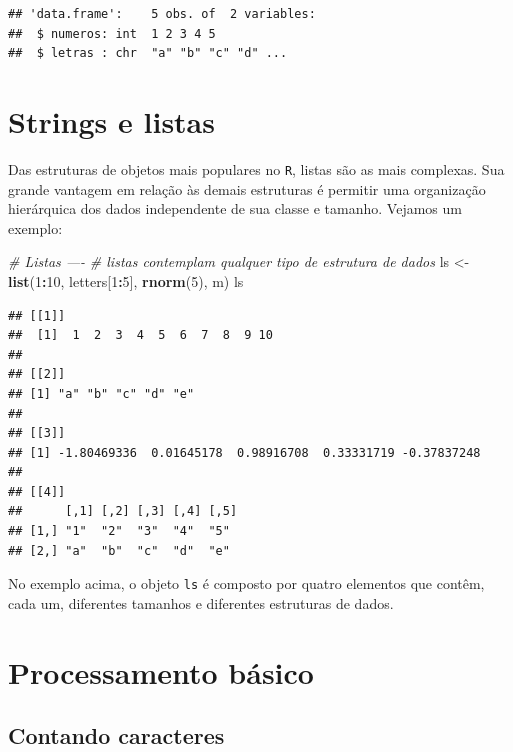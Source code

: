 \documentclass[]{book}
\newenvironment{Shaded}{\begin{snugshade}}{\end{snugshade}}
\newcommand{\CommentTok}[1]{\textcolor[rgb]{0.56,0.35,0.01}{\textit{#1}}}
\newcommand{\DecValTok}[1]{\textcolor[rgb]{0.00,0.00,0.81}{#1}}
\newcommand{\KeywordTok}[1]{\textcolor[rgb]{0.13,0.29,0.53}{\textbf{#1}}}
\newcommand{\NormalTok}[1]{#1}
\newcommand{\OperatorTok}[1]{\textcolor[rgb]{0.81,0.36,0.00}{\textbf{#1}}}
\newcommand{\StringTok}[1]{\textcolor[rgb]{0.31,0.60,0.02}{#1}}
\begin{document}
\begin{verbatim}
## 'data.frame':	5 obs. of  2 variables:
##  $ numeros: int  1 2 3 4 5
##  $ letras : chr  "a" "b" "c" "d" ...
\end{verbatim}

\hypertarget{strings-e-listas}{%
\section{Strings e listas}\label{strings-e-listas}}

Das estruturas de objetos mais populares no \texttt{R}, listas são as mais complexas. Sua grande vantagem em relação às demais estruturas é permitir uma organização hierárquica dos dados independente de sua classe e tamanho. Vejamos um exemplo:

\begin{Shaded}
\begin{Highlighting}[]
\CommentTok{# Listas ----}
\CommentTok{# listas contemplam qualquer tipo de estrutura de dados}
\NormalTok{ls <-}\StringTok{ }\KeywordTok{list}\NormalTok{(}\DecValTok{1}\OperatorTok{:}\DecValTok{10}\NormalTok{, letters[}\DecValTok{1}\OperatorTok{:}\DecValTok{5}\NormalTok{], }\KeywordTok{rnorm}\NormalTok{(}\DecValTok{5}\NormalTok{), m)}
\NormalTok{ls}
\end{Highlighting}
\end{Shaded}

\begin{verbatim}
## [[1]]
##  [1]  1  2  3  4  5  6  7  8  9 10
## 
## [[2]]
## [1] "a" "b" "c" "d" "e"
## 
## [[3]]
## [1] -1.80469336  0.01645178  0.98916708  0.33331719 -0.37837248
## 
## [[4]]
##      [,1] [,2] [,3] [,4] [,5]
## [1,] "1"  "2"  "3"  "4"  "5" 
## [2,] "a"  "b"  "c"  "d"  "e"
\end{verbatim}

No exemplo acima, o objeto \texttt{ls} é composto por quatro elementos que contêm, cada um, diferentes tamanhos e diferentes estruturas de dados.

\hypertarget{processamento-buxe1sico}{%
\section{Processamento básico}\label{processamento-buxe1sico}}

\hypertarget{contando-caracteres}{%
\subsection{Contando caracteres}\label{contando-caracteres}}
\end{document}
